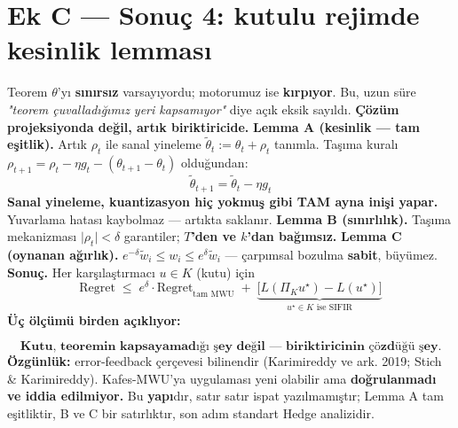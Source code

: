 \documentclass[11pt]{article}
\begin{document}
\section*{Ek C --- Sonuç 4: kutulu rejimde kesinlik lemması}
Teorem $\theta$'yı \textbf{sınırsız} varsayıyordu; motorumuz ise \textbf{kırpıyor}. Bu, uzun süre \emph{"teorem çuvalladığımız yeri kapsamıyor"} diye açık eksik sayıldı. \textbf{Çözüm projeksiyonda değil, artık biriktiricide.}
\textbf{Lemma A (kesinlik — tam eşitlik).} Artık $\rho_t$ ile sanal yineleme $\tilde\theta_t := \theta_t+\rho_t$ tanımla. Taşıma kuralı $\rho_{t+1}=\rho_t-\eta g_t-(\theta_{t+1}-\theta_t)$ olduğundan:
\[\boxed{\tilde\theta_{t+1}=\tilde\theta_t-\eta g_t}\]
\textbf{Sanal yineleme, kuantizasyon hiç yokmuş gibi TAM ayna inişi yapar.} Yuvarlama hatası kaybolmaz — artıkta saklanır.
\textbf{Lemma B (sınırlılık).} Taşıma mekanizması $\lvert\rho_t\rvert<\delta$ garantiler; \textbf{$T$'den ve $k$'dan bağımsız.}
\textbf{Lemma C (oynanan ağırlık).} $e^{-\delta}\tilde w_i \le w_i \le e^{\delta}\tilde w_i$ — çarpımsal bozulma \textbf{sabit}, büyümez.
\textbf{Sonuç.} Her karşılaştırmacı $u\in K$ (kutu) için
\[\mathrm{Regret}\;\le\;e^{\delta}\cdot\mathrm{Regret}_{\text{tam MWU}}\;+\;\underbrace{\big[L(\Pi_K u^\star)-L(u^\star)\big]}_{u^\star\in K \text{ ise SIFIR}}\]
\textbf{Üç ölçümü birden açıklıyor:}
\begin{center}\small{}\end{center}
\[\textbf{Kutu, teoremin kapsayamadığı şey değil — biriktiricinin çözdüğü şey.}\]
 \textbf{Özgünlük:} error-feedback çerçevesi bilinendir (Karimireddy ve ark. 2019; Stich \& Karimireddy). Kafes-MWU'ya uygulaması yeni olabilir ama \textbf{doğrulanmadı ve iddia edilmiyor.}  Bu \textbf{yapı}dır, satır satır ispat yazılmamıştır; Lemma A tam eşitliktir, B ve C bir satırlıktır, son adım standart Hedge analizidir.
\end{document}
